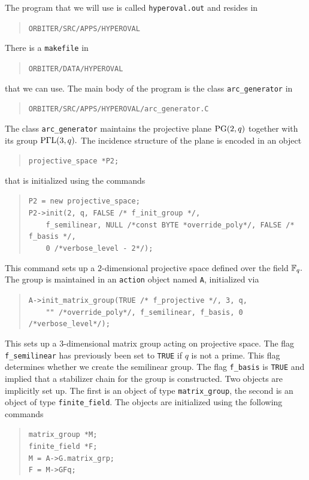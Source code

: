  
The program that we will use is called \verb'hyperoval.out' and resides in 
\begin{quote}
\verb'ORBITER/SRC/APPS/HYPEROVAL'
\end{quote}
There is a \verb'makefile' in 
\begin{quote}
\verb'ORBITER/DATA/HYPEROVAL'
\end{quote}
that we can use. 
The main body of the program is the class \verb'arc_generator' in 
\begin{quote}
\verb'ORBITER/SRC/APPS/HYPEROVAL/arc_generator.C'
\end{quote}
The class \verb'arc_generator' maintains the projective plane 
${\rm PG}(2,q)$ together with its group ${\rm P}\Gamma{\rm L}(3,q).$
The incidence structure of the plane is encoded in an object 
\begin{quote}
\verb'projective_space *P2;'
\end{quote}
that is initialized using the commands
\begin{quote}
\verb'P2 = new projective_space;'\\
\verb'P2->init(2, q, FALSE /* f_init_group */, '\\
\verb'    f_semilinear, NULL /*const BYTE *override_poly*/, FALSE /* f_basis */, '\\
\verb'    0 /*verbose_level - 2*/);'\\
\end{quote}
This command sets up a $2$-dimensional projective space defined over the field ${\mathbb F}_q.$
The group is maintained in an \verb'action' object named 
\verb'A', initialized via
\begin{quote}
\verb'A->init_matrix_group(TRUE /* f_projective */, 3, q, '\\
\verb'    "" /*override_poly*/, f_semilinear, f_basis, 0 /*verbose_level*/);'\\
\end{quote}
This sets up a $3$-dimensional matrix group acting on projective space. 
The flag \verb'f_semilinear' has previously been set to \verb'TRUE' if $q$ is not a prime. This flag determines whether we create the semilinear group.
The flag \verb'f_basis' is \verb'TRUE' and implied that a stabilizer 
chain for the group is constructed.
Two objects are implicitly set up. The first is an object of type \verb'matrix_group', 
the second is an object of type \verb'finite_field'.
The objects are initialized using the following commands
\begin{quote}
\verb'matrix_group *M;'\\
\verb'finite_field *F;'\\
\verb'M = A->G.matrix_grp;'\\
\verb'F = M->GFq;'\\
\end{quote}
